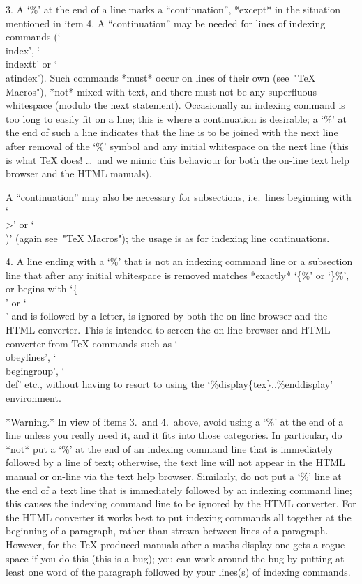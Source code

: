 \item{3.}
A `\%' at the end of a line marks a  ``continuation'',  *except*  in  the
situation mentioned in item 4. A ``continuation'' may be needed for lines
of  indexing  commands  (`\\index',  `\\indextt'  or  `\\atindex').  Such
commands *must* occur on lines of their  own  (see~"TeX  Macros"),  *not*
mixed with text, and there must not be any superfluous whitespace (modulo
the next statement). Occasionally an indexing  command  is  too  long  to
easily fit on a line; this is where a continuation is desirable;  a  `\%'
at the end of such a line indicates that the line is to  be  joined  with
the next line after removal of the `\%' symbol and any initial whitespace
on the next line (this is what  {\TeX}  does!  \dots~and  we  mimic  this
behaviour for both the on-line text help browser and the HTML manuals).

A ``continuation'' may also  be  necessary  for  subsections,  i.e.~lines
beginning with `\\>' or `\\)' (again see~"TeX Macros"); the usage  is  as
for indexing line continuations.

\item{4.}
A line ending with a `\%' that is not  an  indexing  command  line  or  a
subsection line that after any  initial  whitespace  is  removed  matches
*exactly* `\{\%' or `\}\%', or begins with `\{\\' or `\\' and is followed
by a letter, is  ignored  by  both  the  on-line  browser  and  the  HTML
converter. This is intended  to  screen  the  on-line  browser  and  HTML
converter from {\TeX} commands  such  as  `\\obeylines',  `\\begingroup',
`\\def'   etc.,   without    having    to    resort    to    using    the
`\%display\{tex\}..\%enddisplay' environment.

\endlist

*Warning.* In view of items 3.~and 4.~above, avoid using a  `\%'  at  the
end of a line  unless  you  really  need  it,  and  it  fits  into  those
categories. In particular, do *not* put a `\%' at the end of an  indexing
command line that is immediately followed by a line of  text;  otherwise,
the text line will not appear in the HTML manual or on-line via the  text
help browser. Similarly, do not put a `\%' line at the end of a text line
that is immediately followed by an indexing command line; this causes the
indexing command line to be ignored by the HTML converter. For  the  HTML
converter it works best to put indexing  commands  all  together  at  the
beginning  of  a  paragraph,  rather  than  strewn  between  lines  of  a
paragraph. However, for the {\TeX}-produced manuals after a maths display
one gets a rogue space if you do this (this  is  a  bug);  you  can  work
around the bug by putting at least one word of the paragraph followed  by
your lines(s) of indexing commands.

